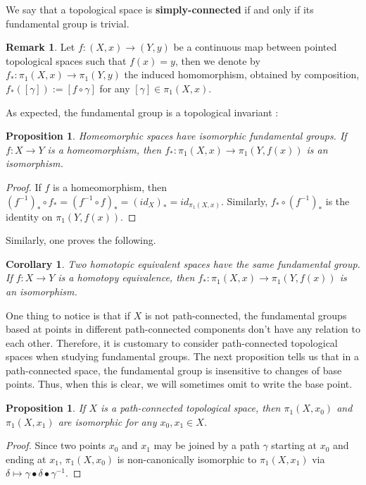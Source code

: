 \documentclass{article}
\theoremstyle{plain}
\newtheorem{proposition}[theorem]{Proposition}
\newtheorem{corollary}[theorem]{Corollary}
\theoremstyle{definition}
\newtheorem{remark}{Remark}
\begin{document}
\noindent We say that a topological space is \textbf{simply-connected} if and only if its fundamental group is trivial.
\begin{remark}
    Let $f:(X,x)\rightarrow (Y,y)$ be a continuous map between pointed topological spaces such that $f(x)=y $, then we denote by $f_*:\pi_1(X,x)\rightarrow\pi_1(Y,y)$ the induced homomorphism, obtained by composition, $f_*([\gamma]) := [f \circ\gamma]$ for any $[\gamma]\in \pi_1(X,x)$.
\end{remark}
\noindent As expected, the fundamental group is a topological invariant :
\begin{proposition}
    Homeomorphic spaces have isomorphic fundamental groups.
    If $f:X\rightarrow Y$ is a homeomorphism, then $f_ *:\pi_1(X,x)\rightarrow \pi_1(Y,f(x))$ is an isomorphism.
\end{proposition}
\begin{proof}
    If $f$ is a homeomorphism, then $(f^{-1})_*\circ f_* = (f^{-1}\circ f)_* = (id_X)_* = id_{\pi_1(X,x)}$. Similarly, $f_* \circ (f^{-1})_*$ is the identity on $\pi_1(Y,f(x))$.
\end{proof}
\noindent Similarly, one proves the following.
\begin{corollary}
    Two homotopic equivalent spaces have the same fundamental group.
    If $f:X\rightarrow Y$ is a homotopy equivalence, then $f_ *:\pi_1(X,x)\rightarrow \pi_1(Y,f(x))$ is an isomorphism.
\end{corollary}

\noindent One thing to notice is that if $X$ is not path-connected, the fundamental groups based at points in different path-connected components don't have any relation to each other. 
Therefore, it is customary to consider path-connected topological spaces when studying fundamental groups.
The next proposition tells us that in a path-connected space, the fundamental group is insensitive to changes of base points.
Thus, when this is clear, we will sometimes omit to write the base point.
\begin{proposition}
\label{fund_grou_base_pt}
    If $X$ is a path-connected topological space, then $\pi_1(X, x_0)$ and $\pi_1(X, x_1)$ are isomorphic for any $x_0,x_1\in X$.
\end{proposition}
\begin{proof}
    Since two points $x_0$ and $x_1$ may be joined by a path $\gamma$ starting at $x_0$ and ending at $x_1$, $\pi_1(X,x_0)$ is non-canonically isomorphic to $\pi_1(X,x_1)$ via $\delta \mapsto \gamma\bullet \delta \bullet \gamma^{-1}$.
\end{proof}
\end{document}
